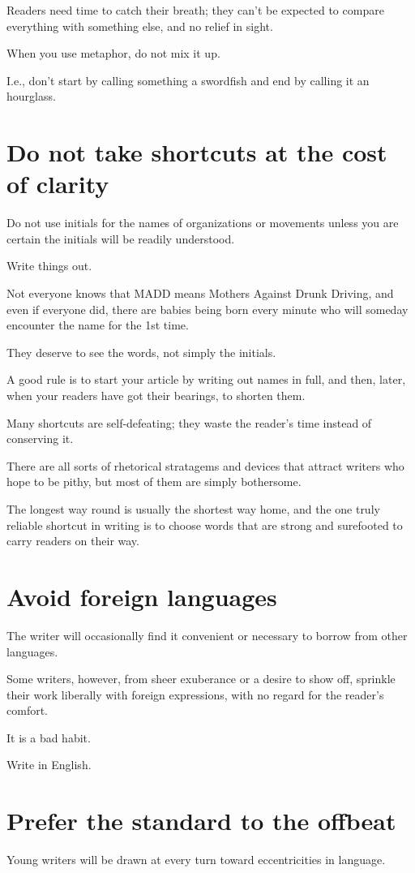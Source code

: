 \documentclass{book}
\numberwithin{equation}{section}
\begin{document}
Readers need time to catch their breath; they can't be expected to compare everything with something else, and no relief in sight.

%
When you use metaphor, do not mix it up.

I.e., don't start by calling something a swordfish and end by calling it an hourglass.

\section{Do not take shortcuts at the cost of clarity}
Do not use initials for the names of organizations or movements unless you are certain the initials will be readily understood.

Write things out.

Not everyone knows that MADD means Mothers Against Drunk Driving, and even if everyone did, there are babies being born every minute who will someday encounter the name for the 1st time.

They deserve to see the words, not simply the initials.

A good rule is to start your article by writing out names in full, and then, later, when your readers have got their bearings, to shorten them.

%
Many shortcuts are self-defeating; they waste the reader's time instead of conserving it.

There are all sorts of rhetorical stratagems and devices that attract writers who hope to be pithy, but most of them are simply bothersome.

The longest way round is usually the shortest way home, and the one truly reliable shortcut in writing is to choose words that are strong and surefooted to carry readers on their way.

\section{Avoid foreign languages}
The writer will occasionally find it convenient or necessary to borrow from other languages.

Some writers, however, from sheer exuberance or a desire to show off, sprinkle their work liberally with foreign expressions, with no regard for the reader's comfort.

It is a bad habit.

Write in English.

\section{Prefer the standard to the offbeat}
Young writers will be drawn at every turn toward eccentricities in language.
\end{document}
